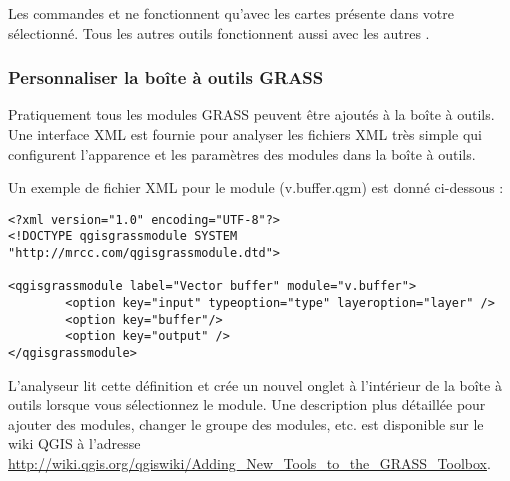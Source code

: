Les commandes  et  ne fonctionnent qu'avec les cartes pr\'esente dans votre  s\'electionn\'e. Tous les autres outils fonctionnent aussi avec les autres .

\subsubsection{Personnaliser la bo\^ite \`a outils GRASS} 
\label{sec:toolbox-customizing}

Pratiquement tous les modules GRASS peuvent \^etre ajout\'es \`a la bo\^ite \`a outils. Une interface XML est fournie pour analyser les fichiers XML 
tr\`es simple qui configurent l'apparence et les param\`etres des modules dans la bo\^ite \`a outils.

Un exemple de fichier XML pour le module  (v.buffer.qgm) est donn\'e ci-dessous :
\begin{verbatim}
<?xml version="1.0" encoding="UTF-8"?>
<!DOCTYPE qgisgrassmodule SYSTEM "http://mrcc.com/qgisgrassmodule.dtd">

<qgisgrassmodule label="Vector buffer" module="v.buffer">
        <option key="input" typeoption="type" layeroption="layer" />
        <option key="buffer"/>
        <option key="output" />
</qgisgrassmodule>
\end{verbatim}

L'analyseur lit cette d\'efinition et cr\'ee un nouvel onglet \`a l'int\'erieur de la bo\^ite \`a outils lorsque vous s\'electionnez le module. Une description plus d\'etaill\'ee pour ajouter des modules, changer le groupe des modules, etc. est disponible sur le wiki QGIS \`a l'adresse \\\url{http://wiki.qgis.org/qgiswiki/Adding\_New\_Tools\_to\_the\_GRASS\_Toolbox}.
